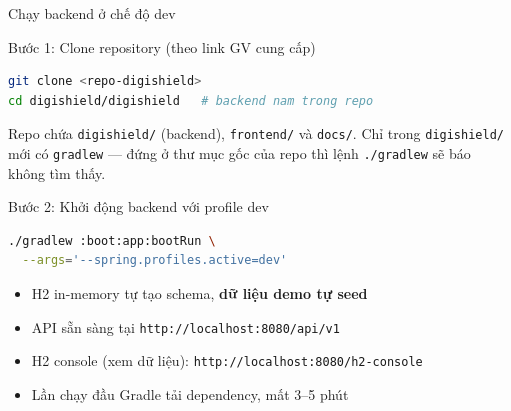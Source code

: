 \documentclass[aspectratio=169,12pt]{beamer}
\begin{document}
\begin{frame}[fragile]{Chạy backend ở chế độ dev}
  \begin{block}{Bước 1: Clone repository (theo link GV cung cấp)}
\begin{lstlisting}[language=bash]
git clone <repo-digishield>
cd digishield/digishield   # backend nam trong repo
\end{lstlisting}
  \end{block}

  \vspace{-0.3em}
  {\footnotesize Repo chứa \texttt{digishield/} (backend), \texttt{frontend/}
  và \texttt{docs/}. Chỉ trong \texttt{digishield/} mới có \texttt{gradlew} ---
  đứng ở thư mục gốc của repo thì lệnh \texttt{./gradlew} sẽ báo không tìm thấy.}

  \begin{block}{Bước 2: Khởi động backend với profile dev}
\begin{lstlisting}[language=bash]
./gradlew :boot:app:bootRun \
  --args='--spring.profiles.active=dev'
\end{lstlisting}
  \end{block}

  \small
  \begin{itemize}
    \item H2 in-memory tự tạo schema, \textbf{dữ liệu demo tự seed}
    \item API sẵn sàng tại \texttt{http://localhost:8080/api/v1}
    \item H2 console (xem dữ liệu): \texttt{http://localhost:8080/h2-console}
    \item Lần chạy đầu Gradle tải dependency, mất 3--5 phút
  \end{itemize}
\end{frame}
\end{document}
